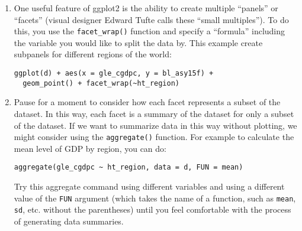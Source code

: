 \documentclass[a4paper,12pt]{article}
\begin{document}
\begin{enumerate}
\item One useful feature of ggplot2 is the ability to create multiple ``panels'' or ``facets'' (visual designer Edward Tufte calls these ``small multiples''). To do this, you use the \texttt{facet\_wrap()} function and specify a ``formula'' including the variable you would like to split the data by. This example create subpanels for different regions of the world:

\begin{verbatim}
ggplot(d) + aes(x = gle_cgdpc, y = bl_asy15f) + 
  geom_point() + facet_wrap(~ht_region)
\end{verbatim}

\item Pause for a moment to consider how each facet represents a subset of the dataset. In this way, each facet is a summary of the dataset for only a subset of the dataset. If we want to summarize data in this way without plotting, we might consider using the \texttt{aggregate()} function. For example to calculate the mean level of GDP by region, you can do:

\begin{verbatim}
aggregate(gle_cgdpc ~ ht_region, data = d, FUN = mean)
\end{verbatim}

\noindent Try this aggregate command using different variables and using a different value of the \texttt{FUN} argument (which takes the name of a function, such as \texttt{mean}, \texttt{sd}, etc. without the parentheses) until you feel comfortable with the process of generating data summaries.


\end{enumerate}
\end{document}
